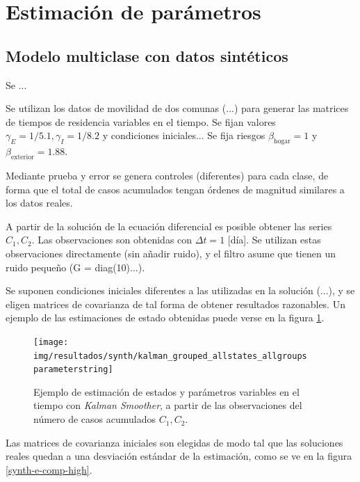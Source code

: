 \section{Estimación de parámetros}\label{sec:estimacion-results}

\subsection{Modelo multiclase con datos sintéticos} \label{subsec:sintetico}

Se ...

Se utilizan los datos de movilidad de dos comunas (...) para generar las matrices de tiempos de residencia variables en el tiempo. Se fijan valores \(\gamma_E = 1/5.1, \gamma_I = 1/8.2\) y condiciones iniciales... Se fija riesgos \(\beta_{\text{hogar}} = 1\) y \(\beta_{\text{exterior}} = 1.88\). 

Mediante prueba y error se genera controles (diferentes) para cada clase, de forma que el total de casos acumulados tengan órdenes de magnitud similares a los datos reales.

A partir de la solución de la ecuación diferencial es posible obtener las series \(C_1, C_2\). Las observaciones son obtenidas con \(\Delta t = 1\) [día]. Se utilizan estas observaciones directamente (sin añadir ruido), y el filtro asume que tienen un ruido pequeño (G = diag(10)...). 

Se suponen condiciones iniciales diferentes a las utilizadas en la solución (...), y se eligen matrices de covarianza de tal forma de obtener resultados razonables. Un ejemplo de las estimaciones de estado obtenidas puede verse en la figura \ref{synth-all-nohigh}.



\begin{figure}[!h]
\centering
\texttt{[image: img/resultados/synth/kalman\_grouped\_allstates\_allgroups\\parameterstring]}
\caption{Ejemplo de estimación de estados y parámetros variables en el tiempo con \textit{Kalman Smoother}, a partir de las observaciones del número de casos acumulados \(C_1, C_2\).}
\label{synth-all-nohigh}
\end{figure}

Las matrices de covarianza iniciales son elegidas de modo tal que las soluciones reales quedan a una desviación estándar de la estimación, como se ve en la figura \ref{synth-e-comp-high}.


